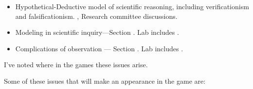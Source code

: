 \begin{refsection}
\begin{itemize}
\item Hypothetical-Deductive model of scientific reasoning, including verificationism and falsificationism. , Research committee discussions.

\item Modeling in scientific inquiry---Section . Lab includes .

\item Complications of observation --- Section . Lab includes .

\end{itemize}

I've noted where in the games these issues arise.

Some of these issues that will make an appearance in the game are:

 \begin{longtable}[!t]{ | P{4cm} | P{3cm} |  P{10cm} | }
\hline


\end{longtable}
\end{refsection}
